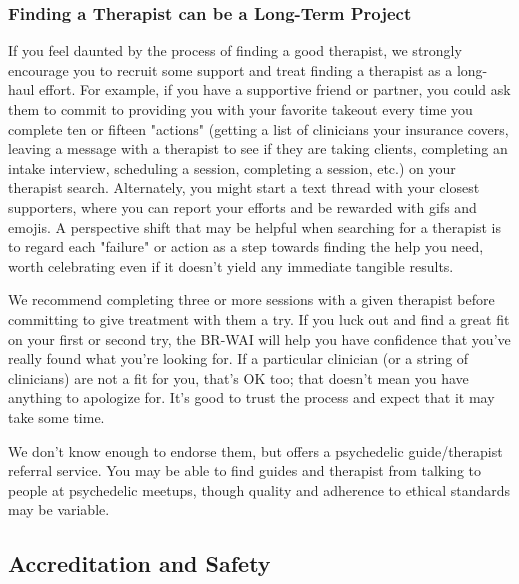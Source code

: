\documentclass[12pt,letterpaper]{book}
\begin{document}
\subsubsection*{Finding a Therapist can be a Long-Term Project}
If you feel daunted by the process of finding a good therapist, we strongly encourage you to recruit some support and treat finding a therapist as a long-haul effort. For example, if you have a supportive friend or partner, you could ask them to commit to providing you with your favorite takeout every time you complete ten or fifteen "actions" (getting a list of clinicians your insurance covers, leaving a message with a therapist to see if they are taking clients, completing an intake interview, scheduling a session, completing a session, etc.) on your therapist search. Alternately, you might start a text thread with your closest supporters, where you can report your efforts and be rewarded with gifs and emojis. A perspective shift that may be helpful when searching for a therapist is to regard each "failure" or action as a step towards finding the help you need, worth celebrating even if it doesn't yield any immediate tangible results.

We recommend completing three or more sessions with a given therapist before committing to give treatment with them a try. If you luck out and find a great fit on your first or second try, the BR-WAI will help you have confidence that you've really found what you're looking for. If a particular clinician (or a string of clinicians) are not a fit for you, that's OK too; that doesn't mean you have anything to apologize for. It's good to trust the process and expect that it may take some time.

We don't know enough to endorse them, but \textcite{psychedelicPassage} offers a psychedelic guide/therapist referral service. You may be able to find guides and therapist from talking to people at psychedelic meetups, though quality and adherence to ethical standards may be variable.

\subsection*{Accreditation and Safety}
\label{sec:accreditation}
\end{document}
